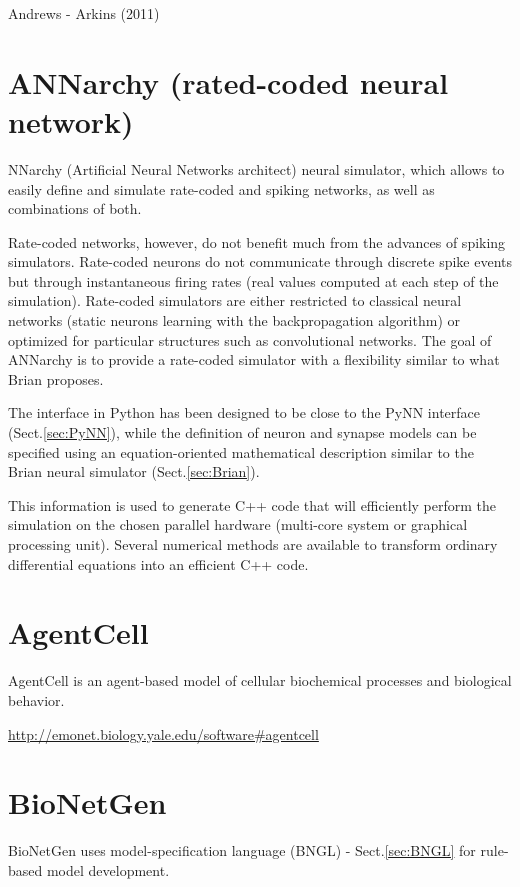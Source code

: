 Andrews - Arkins (2011)

\section{ANNarchy (rated-coded neural network)}
\label{sec:ANNarchy}

NNarchy (Artificial Neural Networks architect) neural simulator, which allows to
easily define and simulate rate-coded and spiking networks, as well as
combinations of both.

Rate-coded networks, however, do not benefit much from the advances of spiking
simulators. Rate-coded neurons do not communicate through discrete spike events
but through instantaneous firing rates (real values computed at each step of the
simulation). Rate-coded simulators are either restricted to classical neural
networks (static neurons learning with the backpropagation algorithm) or
optimized for particular structures such as convolutional networks.
The goal of ANNarchy is to provide a rate-coded simulator with a flexibility
similar to what Brian proposes.

The interface in Python has been designed to be close to the PyNN interface
(Sect.\ref{sec:PyNN}), while the definition of neuron and synapse models can be
specified using an equation-oriented mathematical description similar to the
Brian neural simulator (Sect.\ref{sec:Brian}).

This information is used to generate C++ code that will efficiently perform the
simulation on the chosen parallel hardware (multi-core system or graphical
processing unit). Several numerical methods are available to transform ordinary differential equations
into an efficient C++ code.


\section{AgentCell}
\label{sec:AgentCell}



AgentCell is an agent-based model of cellular biochemical processes and biological behavior.

\url{http://emonet.biology.yale.edu/software#agentcell}

\section{BioNetGen}
\label{sec:BioNetGen}

BioNetGen uses model-specification language (BNGL) - Sect.\ref{sec:BNGL} for
rule-based model development. 

